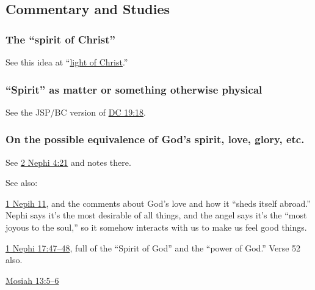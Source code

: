 	
\subsection{Commentary and Studies} %
	\label{SPIRIT-COMMENTARY}

	
		
	\subsubsection{The ``spirit of Christ''}
		\label{SPIRIT-christ}
		
		See this idea at ``\hyperref[LIGHT-christ]{light of Christ}.''
		
	\subsubsection{``Spirit'' as matter or something otherwise physical}
		\label{SPIRIT-matter}
		
		\begin{compactitem}
			\item See the JSP/BC version of \hyperref[DC19-18]{DC 19:18}.
		\end{compactitem}
		
	\subsubsection{On the possible equivalence of God's spirit, love, glory, etc.}
		\label{SPIRIT-equivalence}
		
		See \hyperref[2NEPHI-4-21]{2 Nephi 4:21} and notes there.
		
		See also:
		
			\begin{compactitem}
				\item \hyperref[1NEPHI-11]{1 Nepih 11}, and the comments about God's love and how it ``sheds itself abroad.'' Nephi says it's the most desirable of all things, and the angel says it's the ``most joyous to the soul,'' so it somehow interacts with us to make us feel good things.
				\item \hyperref[1NEPHI-17-47]{1 Nephi 17:47--48}, full of the ``Spirit of God'' and the ``power of God.'' Verse 52 also.
				\item \hyperref[MOSIAH-13-5]{Mosiah 13:5--6}
			\end{compactitem} 